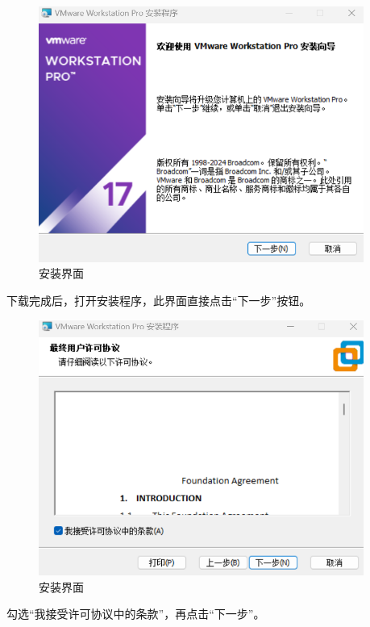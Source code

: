 \documentclass[UTF8]{ctexart}
\begin{document}
\begin{figure}[H]
    \centering
    \includegraphics[width=0.95\textwidth]{picture/Screenshot 2024-10-14 103330.png}
    \caption{安装界面}
\end{figure}
下载完成后，打开安装程序，此界面直接点击“下一步”按钮。

\begin{figure}[H]
    \centering
    \includegraphics[width=0.95\textwidth]{picture/Screenshot 2024-10-14 103946.png}
    \caption{安装界面}
\end{figure}

勾选“我接受许可协议中的条款”，再点击“下一步”。
\end{document}

